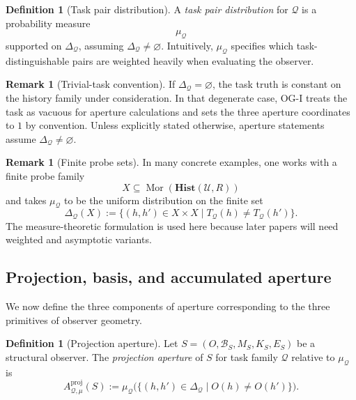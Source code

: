 \documentclass[11pt,twoside]{article}
\theoremstyle{definition}
\newtheorem{definition}[theorem]{Definition}
\newtheorem{remark}[theorem]{Remark}
\newcommand{\Hist}{\mathbf{Hist}}
\newcommand{\proj}{\mathrm{proj}}
\DeclareMathOperator{\Mor}{Mor}
\begin{document}
\begin{definition}[Task pair distribution]
\label{def:task-pair-distribution}
A \emph{task pair distribution} for \(\mathcal{Q}\) is a probability measure
\[
  \mu_{\mathcal{Q}}
\]
supported on \(\Delta_{\mathcal{Q}}\), assuming \(\Delta_{\mathcal{Q}}\neq\varnothing\).
Intuitively, \(\mu_{\mathcal{Q}}\) specifies which task-distinguishable pairs are weighted heavily when evaluating the observer.
\end{definition}

\begin{remark}[Trivial-task convention]
\label{rem:trivial-task-convention}
If \(\Delta_{\mathcal{Q}}=\varnothing\), the task truth is constant on the history family under consideration. In that degenerate case, OG-I treats the task as vacuous for aperture calculations and sets the three aperture coordinates to \(1\) by convention. Unless explicitly stated otherwise, aperture statements assume \(\Delta_{\mathcal{Q}}\neq\varnothing\).
\end{remark}

\begin{remark}[Finite probe sets]
\label{rem:finite-probe-sets}
In many concrete examples, one works with a finite probe family
\[
  X \subseteq \Mor(\Hist(\mathcal{U},R))
\]
and takes \(\mu_{\mathcal{Q}}\) to be the uniform distribution on the finite set
\[
  \Delta_{\mathcal{Q}}(X)
  :=
  \{(h,h')\in X\times X \mid T_{\mathcal{Q}}(h)\neq T_{\mathcal{Q}}(h')\}.
\]
The measure-theoretic formulation is used here because later papers will need weighted and asymptotic variants.
\end{remark}

\subsection{Projection, basis, and accumulated aperture}
\label{subsec:aperture-profile}

We now define the three components of aperture corresponding to the three primitives of observer geometry.

\begin{definition}[Projection aperture]
\label{def:projection-aperture}
Let \(S=(O,\mathcal{B}_S,M_S,K_S,E_S)\) be a structural observer. The \emph{projection aperture} of \(S\) for task family \(\mathcal{Q}\) relative to \(\mu_{\mathcal{Q}}\) is
\[
  A^{\proj}_{\mathcal{Q},\mu}(S)
  :=
  \mu_{\mathcal{Q}}
  \bigl(
    \{(h,h')\in\Delta_{\mathcal{Q}} \mid O(h)\neq O(h')\}
  \bigr).
\]
\end{definition}
\end{document}
